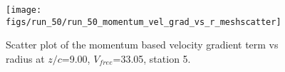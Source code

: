 \begin{figure}[H]
\centering
\texttt{[image: figs/run\_50/run\_50\_momentum\_vel\_grad\_vs\_r\_meshscatter]}
\caption{Scatter plot of the momentum based velocity gradient term vs radius at $z/c$=9.00, $V_{free}$=33.05, station 5.}
\label{fig:run_50_momentum_vel_grad_vs_r_meshscatter}
\end{figure}


